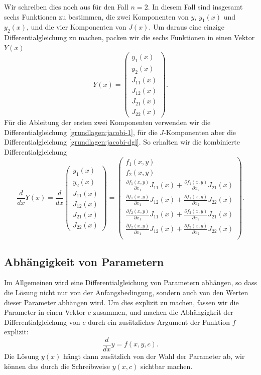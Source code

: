 Wir schreiben dies noch aus für den Fall $n=2$.
In diesem Fall sind insgesamt sechs Funktionen zu bestimmen, die
zwei Komponenten von $y$, $y_1(x)$ und $y_2(x)$, und die vier
Komponenten von $J(x)$.
Um daraus eine einzige Differentialgleichung zu machen, packen wir
die sechs Funktionen in einen Vektor $Y(x)$
\[
Y(x)=
\begin{pmatrix}
y_1(x)\\
y_2(x)\\
J_{11}(x)\\
J_{12}(x)\\
J_{21}(x)\\
J_{22}(x)
\end{pmatrix}.
\]
Für die Ableitung der ersten zwei Komponenten verwenden wir die
Differentialgleichung \eqref{grundlagen:jacobi-1}, für die $J$-Komponenten
aber die Differentialgleichung \eqref{grundlagen:jacobi-dgl}.
So erhalten wir die kombinierte Differentialgleichung
\begin{equation}
\frac{d}{dx}Y(x)
=
\frac{d}{dx}
\begin{pmatrix}
y_1(x)\\
y_2(x)\\
J_{11}(x)\\
J_{12}(x)\\
J_{21}(x)\\
J_{22}(x)
\end{pmatrix}
=
\begin{pmatrix}
f_1(x,y)\\
f_2(x,y)\\
\displaystyle
\frac{\partial f_1(x,y)}{\partial x_1} J_{11}(x)
	+\frac{\partial f_1(x,y)}{\partial x_2} J_{21}(x)\\
\displaystyle
\frac{\partial f_1(x,y)}{\partial x_1} J_{12}(x)
	+\frac{\partial f_1(x,y)}{\partial x_2} J_{22}(x)\\
\displaystyle
\frac{\partial f_2(x,y)}{\partial x_1} J_{11}(x)
	+\frac{\partial f_2(x,y)}{\partial x_2} J_{21}(x)\\
\displaystyle
\frac{\partial f_2(x,y)}{\partial x_1} J_{12}(x)
	+\frac{\partial f_2(x,y)}{\partial x_2} J_{22}(x)\\
\end{pmatrix}.
\end{equation}

\subsection{Abhängigkeit von Parametern}
%
Im Allgemeinen wird eine Differentialgleichung von Parametern abhängen,
so dass die Lösung nicht nur von der Anfangsbedingung, sondern auch von den
Werten dieser Parameter abhängen wird.
Um dies explizit zu machen, fassen wir die Parameter in einen Vektor $c$
zusammen, und machen die Abhängigkeit der Differentialgleichung
von $c$ durch ein zusätzliches Argument der Funktion $f$ explizit:
\[
\frac{d}{dx}y = f(x,y,c).
\]
Die Lösung $y(x)$ hängt dann zusätzlich von der Wahl der Parameter
ab, wir können das durch die Schreibweise $y(x,c)$ sichtbar machen.


